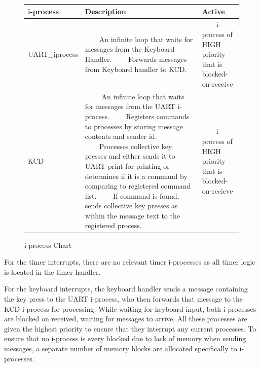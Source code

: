 \documentclass[11pt, oneside]{article}
\newcommand{\tabitem}{~~\llap{\textbullet}~~}
\begin{document}
\begin{figure}[ht!]
\centering
\begin{tabular}{|L{3cm}|L{8cm}|L{3cm}|} \hline
\textbf{i-process}& Description & Active \\ \hline
UART\_iprocess&
\tabitem An infinite loop that waits for messages from the Keyboard Handler.
\newline
\tabitem Forwards messages from Keyboard handler to KCD.
 & \tabitem i-process of HIGH priority that is blocked-on-receive
 \newline
  \\ \hline
KCD&
\tabitem
An infinite loop that waits for messages from the UART i-process.
\newline
\tabitem Registers commands to processes by storing message contents and sender id.
\newline
\tabitem Processes collective key presses and either sends it to UART print for printing or determines if it is a command by comparing to registered command list.
\newline
\tabitem If command is found, sends collective key presses as within the message text to the registered process.
 & \tabitem i-process of HIGH priority that is blocked-on-recieve \\ \hline
\end{tabular}
\caption{i-process Chart\label{overflow}}
\end{figure}

For the timer interrupts, there are no relevant timer i-processes as all timer logic is located in the timer handler.

For the keyboard interrupts, the keyboard handler sends a message containing the key press to the UART i-process, who then forwards that message to the KCD i-process for processing. While waiting for keyboard input, both i-processes are blocked on received, waiting for messages to arrive. All these processes are given the highest priority to ensure that they interrupt any current processes. To ensure that no i-process is every blocked due to lack of memory when sending messages, a separate number of memory blocks are allocated specifically to i-processes.
\end{document}
